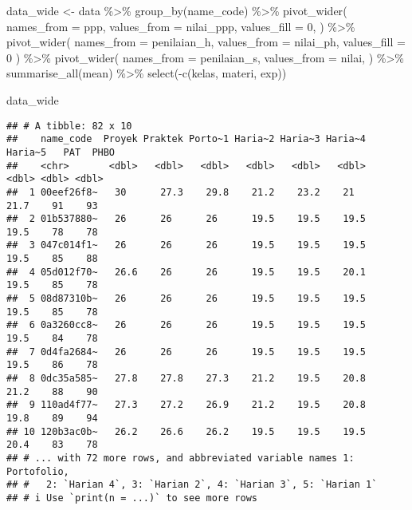 \documentclass[
]{article}
\newenvironment{Shaded}{\begin{snugshade}}{\end{snugshade}}
\newcommand{\AttributeTok}[1]{\textcolor[rgb]{0.77,0.63,0.00}{#1}}
\newcommand{\DecValTok}[1]{\textcolor[rgb]{0.00,0.00,0.81}{#1}}
\newcommand{\FunctionTok}[1]{\textcolor[rgb]{0.00,0.00,0.00}{#1}}
\newcommand{\NormalTok}[1]{#1}
\newcommand{\OtherTok}[1]{\textcolor[rgb]{0.56,0.35,0.01}{#1}}
\newcommand{\SpecialCharTok}[1]{\textcolor[rgb]{0.00,0.00,0.00}{#1}}
\begin{document}
\begin{Shaded}
\begin{Highlighting}[]
\NormalTok{data\_wide }\OtherTok{\textless{}{-}}
\NormalTok{  data }\SpecialCharTok{\%\textgreater{}\%}
  \FunctionTok{group\_by}\NormalTok{(name\_code) }\SpecialCharTok{\%\textgreater{}\%} 
  \FunctionTok{pivot\_wider}\NormalTok{(}
    \AttributeTok{names\_from =}\NormalTok{ ppp,}
    \AttributeTok{values\_from =}\NormalTok{ nilai\_ppp,}
    \AttributeTok{values\_fill =} \DecValTok{0}\NormalTok{,}
\NormalTok{  ) }\SpecialCharTok{\%\textgreater{}\%} 
  \FunctionTok{pivot\_wider}\NormalTok{(}
    \AttributeTok{names\_from =}\NormalTok{ penilaian\_h,}
    \AttributeTok{values\_from =}\NormalTok{ nilai\_ph,}
    \AttributeTok{values\_fill =} \DecValTok{0}
\NormalTok{  ) }\SpecialCharTok{\%\textgreater{}\%} 
  \FunctionTok{pivot\_wider}\NormalTok{(}
    \AttributeTok{names\_from =}\NormalTok{ penilaian\_s,}
    \AttributeTok{values\_from =}\NormalTok{ nilai,}
\NormalTok{  ) }\SpecialCharTok{\%\textgreater{}\%} 
  \FunctionTok{summarise\_all}\NormalTok{(mean) }\SpecialCharTok{\%\textgreater{}\%} 
  \FunctionTok{select}\NormalTok{(}\SpecialCharTok{{-}}\FunctionTok{c}\NormalTok{(kelas, materi, exp))}
  
\NormalTok{data\_wide}
\end{Highlighting}
\end{Shaded}

\begin{verbatim}
## # A tibble: 82 x 10
##    name_code  Proyek Praktek Porto~1 Haria~2 Haria~3 Haria~4 Haria~5   PAT  PHBO
##    <chr>       <dbl>   <dbl>   <dbl>   <dbl>   <dbl>   <dbl>   <dbl> <dbl> <dbl>
##  1 00eef26f8~   30      27.3    29.8    21.2    23.2    21      21.7    91    93
##  2 01b537880~   26      26      26      19.5    19.5    19.5    19.5    78    78
##  3 047c014f1~   26      26      26      19.5    19.5    19.5    19.5    85    88
##  4 05d012f70~   26.6    26      26      19.5    19.5    20.1    19.5    85    78
##  5 08d87310b~   26      26      26      19.5    19.5    19.5    19.5    85    78
##  6 0a3260cc8~   26      26      26      19.5    19.5    19.5    19.5    84    78
##  7 0d4fa2684~   26      26      26      19.5    19.5    19.5    19.5    86    78
##  8 0dc35a585~   27.8    27.8    27.3    21.2    19.5    20.8    21.2    88    90
##  9 110ad4f77~   27.3    27.2    26.9    21.2    19.5    20.8    19.8    89    94
## 10 120b3ac0b~   26.2    26.6    26.2    19.5    19.5    19.5    20.4    83    78
## # ... with 72 more rows, and abbreviated variable names 1: Portofolio,
## #   2: `Harian 4`, 3: `Harian 2`, 4: `Harian 3`, 5: `Harian 1`
## # i Use `print(n = ...)` to see more rows
\end{verbatim}
\end{document}

